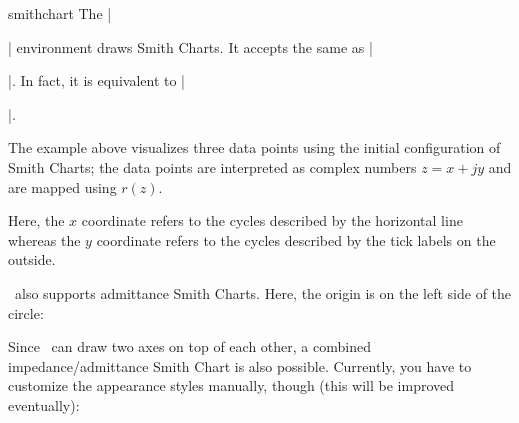 \begin{environment}{{smithchart}}
	The |\begin{smithchart}| environment draws Smith Charts. It accepts the same  as |\begin{axis}|. In fact, it is equivalent to |\begin{axis}[|\meta{options}|,axis type=smithchart]|.
\begin{codeexample}[]
\end{codeexample}
	The example above visualizes three data points using the initial configuration of Smith Charts; the data points are interpreted as complex numbers $z = x + j y$ and are mapped using $r(z)$.

	Here, the $x$ coordinate refers to the cycles described by the horizontal line whereas the $y$ coordinate refers to the cycles described by the tick labels on the outside.

	\PGFPlots\ also supports admittance Smith Charts. Here, the origin is on the left side of the circle:
\begin{codeexample}[]
\end{codeexample}

	Since \PGFPlots\ can draw two axes on top of each other, a combined impedance/admittance Smith Chart is also possible.
	Currently, you have to customize the appearance styles manually, though (this will be improved eventually):
\begin{codeexample}[]
\begin{tikzpicture}[]
\begin{smithchart}[
	title=Impedance and Admittance Smith Chart,
	smithchart mirrored,
	xticklabel shift=-19pt,
	grid style={blue},
	ticklabel style={blue},
	yticklabel around circle,
]
\end{smithchart}


\end{tikzpicture}
\end{codeexample}
\end{axis}
\end{axis}
\end{smithchart}
\end{environment}
